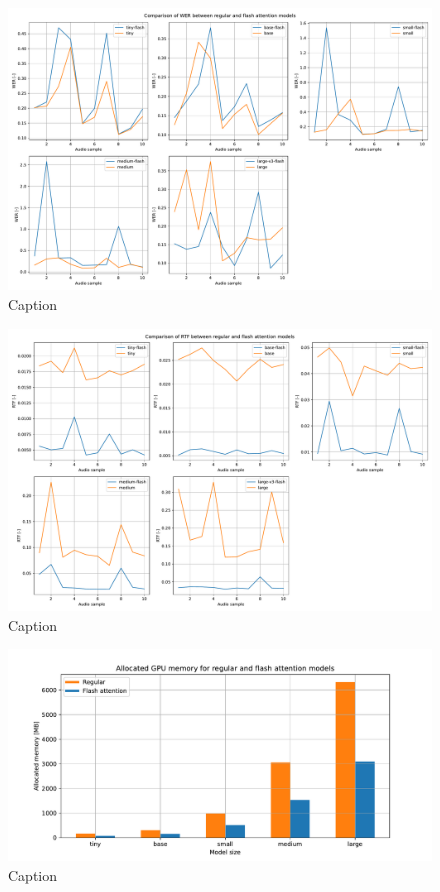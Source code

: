 \begin{figure}
    \centering
    \includegraphics[width=\textwidth]{figures/wer.pdf}
    \caption{Caption}
    \label{fig:whisper_wer}
\end{figure}

\begin{figure}
    \centering
    \includegraphics[width=\textwidth]{figures/rtf.pdf}
    \caption{Caption}
    \label{fig:whisper_rtf}
\end{figure}

\begin{figure}
    \centering
    \includegraphics[width=\textwidth]{figures/memory.pdf}
    \caption{Caption}
    \label{fig:whisper_memory}
\end{figure}

